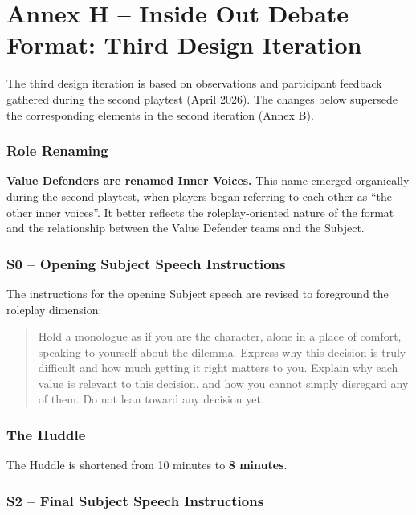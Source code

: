 
\newpage
\section*{Annex H -- Inside Out Debate Format: Third Design Iteration}

The third design iteration is based on observations and participant feedback gathered during the second playtest (April 2026). The changes below supersede the corresponding elements in the second iteration (Annex B).

\subsubsection{Role Renaming}

\textbf{Value Defenders are renamed Inner Voices.} This name emerged organically during the second playtest, when players began referring to each other as ``the other inner voices''. It better reflects the roleplay-oriented nature of the format and the relationship between the Value Defender teams and the Subject.

\subsubsection{S0 -- Opening Subject Speech Instructions}

The instructions for the opening Subject speech are revised to foreground the roleplay dimension:

\begin{quote}
Hold a monologue as if you are the character, alone in a place of comfort, speaking to yourself about the dilemma. Express why this decision is truly difficult and how much getting it right matters to you. Explain why each value is relevant to this decision, and how you cannot simply disregard any of them. Do not lean toward any decision yet.
\end{quote}

\subsubsection{The Huddle}

The Huddle is shortened from 10 minutes to \textbf{8 minutes}.

\subsubsection{S2 -- Final Subject Speech Instructions}

